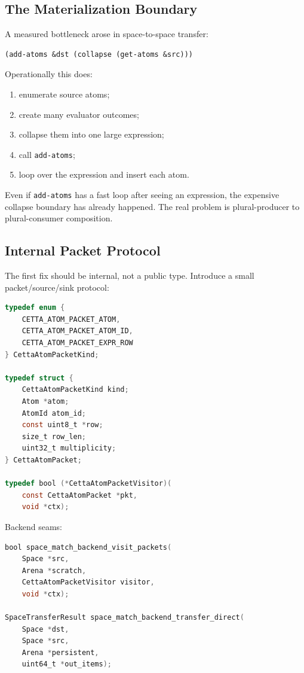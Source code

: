 \documentclass[11pt]{article}
\begin{document}
\subsection{The Materialization Boundary}

A measured bottleneck arose in space-to-space transfer:

\begin{lstlisting}
(add-atoms &dst (collapse (get-atoms &src)))
\end{lstlisting}

Operationally this does:

\begin{enumerate}[leftmargin=*]
  \item enumerate source atoms;
  \item create many evaluator outcomes;
  \item collapse them into one large expression;
  \item call \texttt{add-atoms};
  \item loop over the expression and insert each atom.
\end{enumerate}

Even if \texttt{add-atoms} has a fast loop after seeing an expression, the expensive collapse boundary has already happened.  The real problem is plural-producer to plural-consumer composition.

\subsection{Internal Packet Protocol}

The first fix should be internal, not a public type.  Introduce a small packet/source/sink protocol:

\begin{lstlisting}[language=C]
typedef enum {
    CETTA_ATOM_PACKET_ATOM,
    CETTA_ATOM_PACKET_ATOM_ID,
    CETTA_ATOM_PACKET_EXPR_ROW
} CettaAtomPacketKind;

typedef struct {
    CettaAtomPacketKind kind;
    Atom *atom;
    AtomId atom_id;
    const uint8_t *row;
    size_t row_len;
    uint32_t multiplicity;
} CettaAtomPacket;

typedef bool (*CettaAtomPacketVisitor)(
    const CettaAtomPacket *pkt,
    void *ctx);
\end{lstlisting}

Backend seams:

\begin{lstlisting}[language=C]
bool space_match_backend_visit_packets(
    Space *src,
    Arena *scratch,
    CettaAtomPacketVisitor visitor,
    void *ctx);

SpaceTransferResult space_match_backend_transfer_direct(
    Space *dst,
    Space *src,
    Arena *persistent,
    uint64_t *out_items);
\end{lstlisting}
\end{document}

